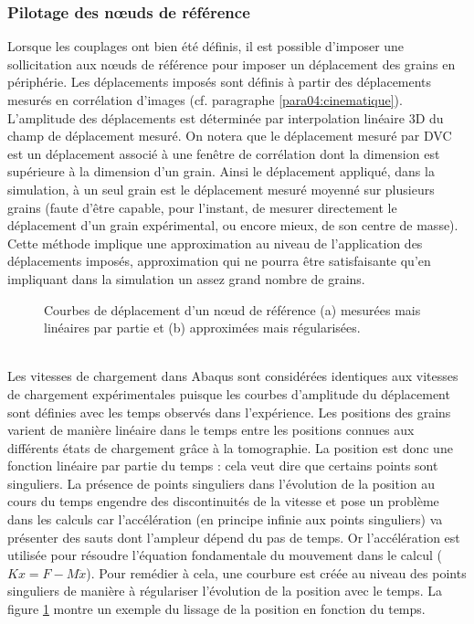 		\subsubsection{Pilotage des n\oe{}uds de référence}
		Lorsque les couplages ont bien été définis, il est possible d'imposer une sollicitation aux n\oe{}uds de référence pour imposer un déplacement des grains en périphérie. Les déplacements imposés sont définis à partir des déplacements mesurés en corrélation d'images (cf. paragraphe \ref{para04:cinematique}). L'amplitude des déplacements est déterminée par interpolation linéaire 3D du champ de déplacement mesuré. On notera que le déplacement mesuré par DVC est un déplacement associé à une fenêtre de corrélation dont la dimension est supérieure à la dimension d'un grain. Ainsi le déplacement appliqué, dans la simulation, à un seul grain est le déplacement mesuré moyenné sur plusieurs grains (faute d'être capable, pour l'instant, de mesurer directement le déplacement d'un grain expérimental, ou encore mieux, de son centre de masse). Cette méthode implique une approximation au niveau de l'application des déplacements imposés, approximation qui ne pourra être satisfaisante qu'en impliquant dans la simulation un assez grand nombre de grains.
		\begin{figure}\centering
			\hfill
			\caption{\label{fig05:courbes_amplitude}Courbes de déplacement d'un n\oe{}ud de référence (a) mesurées mais linéaires par partie et (b) approximées mais régularisées.}
		\end{figure}
		\\Les vitesses de chargement dans Abaqus sont considérées identiques aux vitesses de chargement expérimentales puisque les courbes d'amplitude du déplacement sont définies avec les temps observés dans l'expérience. Les positions des grains varient de manière linéaire dans le temps entre les positions connues aux différents états de chargement grâce à la tomographie. La position est donc une fonction linéaire par partie du temps : cela veut dire que certains points sont singuliers. La présence de points singuliers dans l'évolution de la position au cours du temps engendre des discontinuités de la vitesse et pose un problème dans les calculs car l'accélération (en principe infinie aux points singuliers) va présenter des sauts dont l'ampleur dépend du pas de temps. Or l'accélération est utilisée pour résoudre l'équation fondamentale du mouvement dans le calcul ($Kx = F - M\ddot{x}$). Pour remédier à cela, une courbure est créée au niveau des points singuliers de manière à régulariser l'évolution de la position avec le temps. La figure \ref{fig05:courbes_amplitude} montre un exemple du lissage de la position en fonction du temps.

